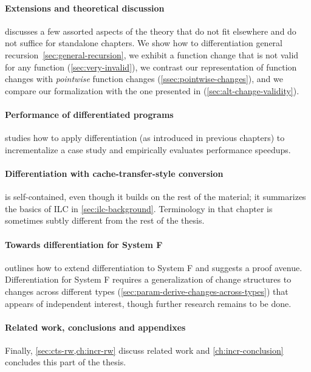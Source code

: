 \paragraph{Extensions and theoretical discussion}
 discusses a few assorted aspects of the theory that do
not fit elsewhere and do not suffice for standalone chapters. We
show how to differentiation general recursion~\cref{sec:general-recursion}, we
exhibit a function change that is not valid for any function
(\cref{sec:very-invalid}), we contrast our representation of function changes
with \emph{pointwise} function changes (\cref{ssec:pointwise-changes}), and we
compare our formalization with the one presented in \citep{CaiEtAl2014ILC}
(\cref{sec:alt-change-validity}).

\paragraph{Performance of differentiated programs}
 studies how to apply differentiation (as introduced in
previous chapters) to incrementalize a case study and empirically evaluates
performance speedups.

\paragraph{Differentiation with cache-transfer-style conversion}
 is self-contained, even though it builds on the rest of the
material; it summarizes the basics of ILC in \cref{sec:ilc-background}.
Terminology in that chapter is sometimes subtly different from the rest of the
thesis.

\paragraph{Towards differentiation for System F}
 outlines how to extend differentiation to
System F and suggests a proof avenue. Differentiation for System F requires a
generalization of change structures to changes across different types
(\cref{sec:param-derive-changes-across-types}) that appears of independent
interest, though further research remains to be done.

\paragraph{Related work, conclusions and appendixes}
Finally, \cref{sec:cts-rw,ch:incr-rw} discuss related work and
\cref{ch:incr-conclusion} concludes this part of the thesis.

